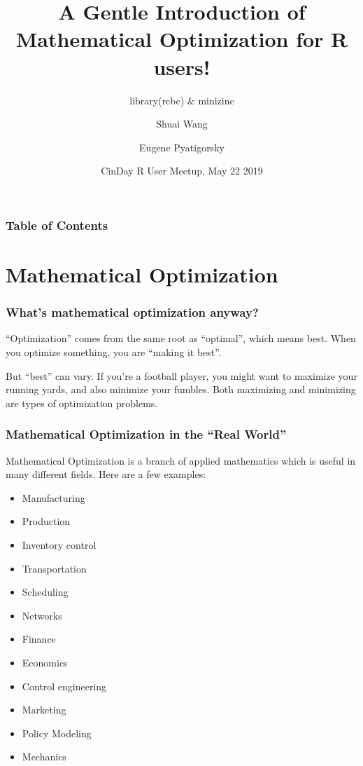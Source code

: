 \documentclass[xcolor=dvipsnames]{beamer}
\title[]{A Gentle Introduction of Mathematical Optimization for R users!}
\subtitle{library(rcbc) \& minizinc}
\author[]{Shuai Wang \and Eugene Pyatigorsky}
\institute[] %
{Kroger/84.51 Operations Research}
\date[] %
{CinDay R User Meetup, May 22 2019}
\begin{document}
\frame{\titlepage}


\begin{frame}
\frametitle{Table of Contents}
\tableofcontents
\end{frame}


\section{Mathematical Optimization}

\begin{frame}
\frametitle{What's mathematical optimization anyway?}
“Optimization” comes from the same root as “optimal”, which means best. When you
optimize something, you are “making it best”.


But “best” can vary. If you’re a football player, you might want to maximize your
running yards, and also minimize your fumbles. Both maximizing and minimizing are types
of optimization problems.
\end{frame}



\begin{frame}
\frametitle{Mathematical Optimization in the “Real World”}
Mathematical Optimization is a branch of applied mathematics which is useful in many different fields. Here are a few examples:
 \begin{multicols}{2}
    \begin{itemize}
        \item Manufacturing
        \item Production
        \item Inventory control
        \item Transportation
        \item Scheduling
        \item Networks
        \item Finance
        \item Economics
        \item Control engineering
        \item Marketing
        \item Policy Modeling
        \item Mechanics
    \end{itemize}
    \end{multicols}

\end{frame}
\end{document}
